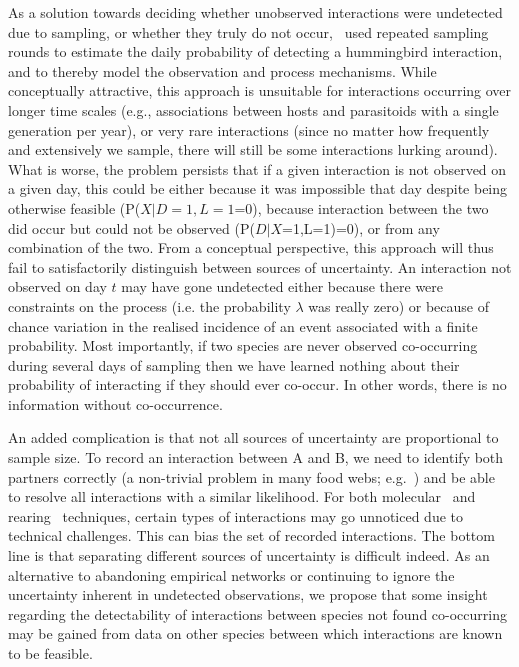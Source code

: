 \documentclass[12pt]{article}
\begin{document}
  As a solution towards deciding whether unobserved interactions were undetected due to sampling, or whether they truly do not occur,~\citet{Weinstein2017} used repeated sampling rounds to estimate the daily probability of detecting a hummingbird interaction, and to thereby model the observation and process mechanisms. While conceptually attractive, this approach is unsuitable for interactions occurring over longer time scales (e.g., associations between hosts and parasitoids with a single generation per year), or very rare interactions (since no matter how frequently and extensively we sample, there will still be some interactions lurking around). What is worse, the problem persists that if a given interaction is not observed on a given day, this could be either because it was impossible that day despite being otherwise feasible (P($X|D=1,L=1$=0), because interaction between the two did occur but could not be observed (P($D|X$=1,L=1)=0), or from any combination of the two. From a conceptual perspective, this approach will thus fail to satisfactorily distinguish between sources of uncertainty. An interaction not observed on day $t$ may have gone undetected either because there were constraints on the process (i.e. the probability $\lambda$ was really zero) or because of chance variation in the realised incidence of an event associated with a finite probability. Most importantly, if two species are never observed co-occurring during several days of sampling then we have learned nothing about their probability of interacting if they should ever co-occur. In other words, there is no information without co-occurrence.


  An added complication is that not all sources of uncertainty are proportional to sample size. To record an interaction between A and B, we need to identify both partners correctly (a non-trivial problem in many food webs; e.g.~\citet{Kaartinen2011,Roslin2016}) and be able to resolve all interactions with a similar likelihood. For both molecular~\citep{} and rearing~\citep{} techniques, certain types of interactions may go unnoticed due to technical challenges. This can bias the set of recorded interactions.
  The bottom line is that separating different sources of uncertainty is difficult indeed. As an alternative to abandoning empirical networks or continuing to ignore the uncertainty inherent in undetected observations, we propose that some insight regarding the detectability of interactions between species not found co-occurring may be gained from data on other species between which interactions are known to be feasible. 
\end{document}
